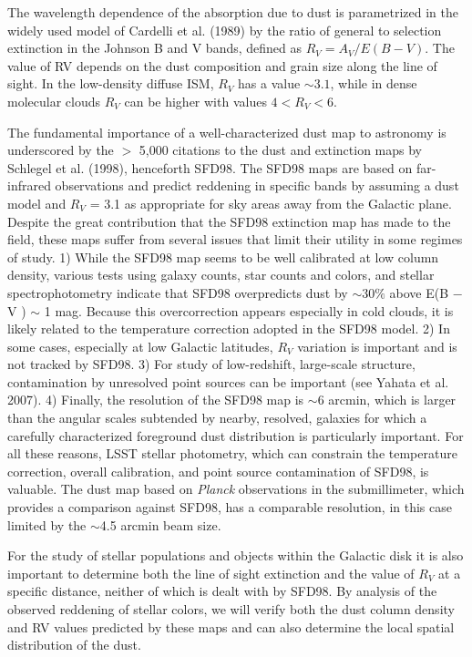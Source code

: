 The wavelength dependence of the absorption due to dust is parametrized in the widely used model
of Cardelli et al. (1989) by the ratio of general to selection extinction in the Johnson B and V
bands, defined as $R_V = A_V /E(B − V)$. The value of RV depends on the dust composition and
grain size along the line of sight. In the low-density diffuse ISM, $R_V$ has a value $\sim 3.1$, while in
dense molecular clouds $R_V$ can be higher with values $4 < R_V < 6$.

The fundamental importance of a well-characterized dust map to astronomy is underscored by the
$>$ 5,000 citations to the dust and extinction maps by Schlegel et al. (1998), henceforth SFD98.
The SFD98 maps are based on far-infrared observations and predict reddening in specific bands by
assuming a dust model and $R_V$ = 3.1 as appropriate for sky areas away from the Galactic plane.
Despite the great contribution that the SFD98 extinction map has made to the field, these maps
suffer from several issues that limit their utility in some regimes of study. 1) While the SFD98
map seems to be well calibrated at low column density, various tests using galaxy counts, star
counts and colors, and stellar spectrophotometry indicate that SFD98 overpredicts dust by $\sim30\%$
above E(B − V ) $\sim$ 1 mag. Because this overcorrection appears especially in cold clouds, it is
likely related to the temperature correction adopted in the SFD98 model. 2) In some cases,
especially at low Galactic latitudes, $R_V$ variation is important and is not tracked by SFD98. 3)
For study of low-redshift, large-scale structure, contamination by unresolved point sources can be
important (see Yahata et al. 2007). 4) Finally, the resolution of the SFD98 map is $\sim$6 arcmin, which
is larger than the angular scales subtended by nearby, resolved, galaxies for which a carefully
characterized foreground dust distribution is particularly important. For all these reasons, LSST
stellar photometry, which can constrain the temperature correction, overall calibration, and point
source contamination of SFD98, is valuable. The dust map based on {\it Planck} observations in the submillimeter, 
which provides a comparison against SFD98, 
has a comparable resolution, in this case limited by the $\sim$4.5 arcmin beam size.

For the study of stellar populations and objects within the Galactic disk it is also important to
determine both the line of sight extinction and the value of $R_V$ at a specific distance, neither of
which is dealt with by SFD98. By analysis of the observed reddening of stellar colors, we will verify
both the dust column density and RV values predicted by these maps and can also determine the
local spatial distribution of the dust.

